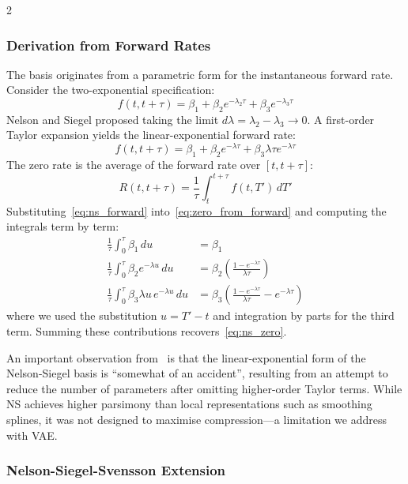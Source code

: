 \documentclass[10pt,a4paper]{article}
\theoremstyle{plain}
\theoremstyle{definition}
\begin{document}
\begin{multicols}{2}
\subsubsection{Derivation from Forward Rates}

The basis originates from a parametric form for the instantaneous forward rate. Consider the two-exponential specification:
\begin{equation}\label{eq:ns_two_exp}
f(t, t+\tau) = \beta_1 + \beta_2 e^{-\lambda_2 \tau} + \beta_3 e^{-\lambda_3 \tau}
\end{equation}
Nelson and Siegel proposed taking the limit $d\lambda = \lambda_2 - \lambda_3 \to 0$. A first-order Taylor expansion yields the linear-exponential forward rate:
\begin{equation}\label{eq:ns_forward}
f(t, t+\tau) = \beta_1 + \beta_2 e^{-\lambda\tau} + \beta_3 \lambda\tau e^{-\lambda\tau}
\end{equation}
The zero rate is the average of the forward rate over $[t, t+\tau]$:
\begin{equation}\label{eq:zero_from_forward}
R(t, t+\tau) = \frac{1}{\tau}\int_t^{t+\tau} f(t, T')\, dT'
\end{equation}
Substituting~\cref{eq:ns_forward} into~\cref{eq:zero_from_forward} and computing the integrals term by term:
\begin{align}
\frac{1}{\tau}\int_0^{\tau} \beta_1\, du &= \beta_1 \\[3pt]
\frac{1}{\tau}\int_0^{\tau} \beta_2 e^{-\lambda u}\, du &= \beta_2 \left(\frac{1 - e^{-\lambda\tau}}{\lambda\tau}\right) \\[3pt]
\frac{1}{\tau}\int_0^{\tau} \beta_3 \lambda u\, e^{-\lambda u}\, du &= \beta_3 \left(\frac{1 - e^{-\lambda\tau}}{\lambda\tau} - e^{-\lambda\tau}\right)
\end{align}
where we used the substitution $u = T' - t$ and integration by parts for the third term. Summing these contributions recovers~\cref{eq:ns_zero}.

An important observation from~\cite{sokol2022} is that the linear-exponential form of the Nelson-Siegel basis is ``somewhat of an accident'', resulting from an attempt to reduce the number of parameters after omitting higher-order Taylor terms. While NS achieves higher parsimony than local representations such as smoothing splines, it was not designed to maximise compression---a limitation we address with VAE.

\subsubsection{Nelson-Siegel-Svensson Extension}


\end{multicols}
\end{document}
